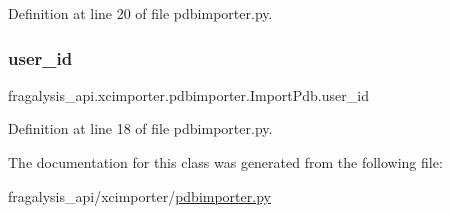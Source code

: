 Definition at line 20 of file pdbimporter.\+py.

\mbox{\label{classfragalysis__api_1_1xcimporter_1_1pdbimporter_1_1_import_pdb_a4e8f2945727ef48feba2a568eab43b3b}} 
\subsubsection{\texorpdfstring{user\+\_\+id}{user\_id}}
{\footnotesize\ttfamily fragalysis\+\_\+api.\+xcimporter.\+pdbimporter.\+Import\+Pdb.\+user\+\_\+id}



Definition at line 18 of file pdbimporter.\+py.



The documentation for this class was generated from the following file\+:\begin{DoxyCompactItemize}
\item 
fragalysis\+\_\+api/xcimporter/\hyperlink{pdbimporter_8py}{pdbimporter.\+py}\end{DoxyCompactItemize}
